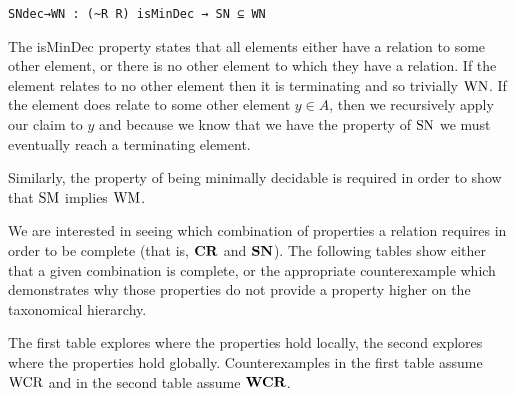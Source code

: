 \verb|SNdec→WN : (~R R) isMinDec → SN ⊆ WN| 


The isMinDec property states that all elements either have a relation to some other element, or 
there is no other element to which they have a relation. If the element relates to no other element then it is terminating 
and so trivially $\mathrm{WN}$. If the element does relate to some other element $y \in A$, then we recursively apply our claim to 
$y$ and because we know that we have the property of $\mathrm{SN}$ we must eventually reach a terminating element. 

Similarly, the property of being minimally decidable is required in order to show that $\mathrm{SM}$ implies $\mathrm{WM}$.

We are interested in seeing which combination of properties a relation requires in order to be complete (that is, $\mathbf{CR}$ and $\mathbf{SN}$). 
The following tables show either that a given combination is complete, or the appropriate counterexample which demonstrates why 
those properties do not provide a property higher on the taxonomical hierarchy. 

The first table explores where the properties hold locally, the second explores where the properties hold globally. Counterexamples in the 
first table assume $\mathrm{WCR}$ and in the second table assume $\mathbf{WCR}$.

